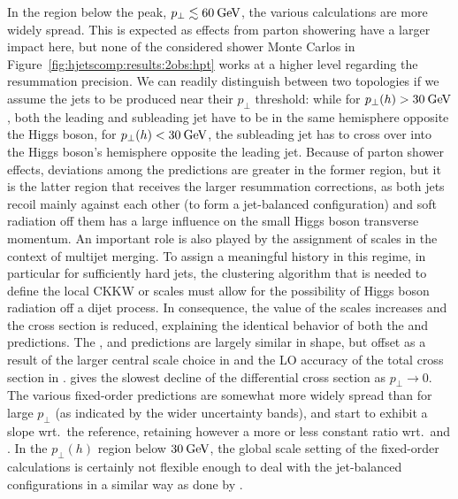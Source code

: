 In the region below the peak, $p_\perp\lesssim 60\text{\:GeV}$, the various
calculations are more widely spread. This is expected as effects from
parton showering have a larger impact here, but none of the considered
shower Monte Carlos in Figure~\ref{fig:hjetscomp:results:2obs:hpt}
works at a higher level regarding the resummation precision. We can
readily distinguish between two topologies if we assume the jets to be
produced near their $p_\perp$ threshold: while for
$p_\perp(h)>30\text{\:GeV}$, both the leading and subleading jet have to be in
the same hemisphere opposite the Higgs boson, for
$p_\perp(h)<30\text{\:GeV}$, the subleading jet has to cross over into the
Higgs boson's hemisphere opposite the leading jet.
Because of  parton shower effects, deviations among the predictions
are greater in the former region, but it is the latter region that
receives the larger resummation corrections, as both jets recoil mainly
against each other (to form a jet-balanced configuration) and soft
radiation off them has a large influence on the small Higgs boson
transverse momentum. An important role is also played by the
assignment of scales in the context of multijet merging.
To assign a meaningful history in this regime, in particular
for sufficiently hard jets, the clustering algorithm that is needed to
define the local CKKW or \Minlo scales must allow for the possibility
of Higgs boson radiation off a dijet process. In consequence, the value
of the scales increases and the cross section is reduced, explaining
the identical behavior of both the \Sherpa \MEPSatNLO and \Sherpa
\NNLOPS predictions.
The \Herwig, \MGaMC and \Hej predictions are largely similar in shape,
but offset as a result of the larger central scale choice in \MGaMC
and the LO accuracy of the total cross section in \Hej. \Powheg
\NNLOPS gives the slowest decline of the differential cross section as
$p_\perp\to0$.
The various fixed-order predictions are somewhat more widely spread than
for large $p_\perp$ (as indicated by the wider uncertainty bands), and
start to exhibit a slope wrt.~the \Powheg reference, retaining however
a more or less constant ratio wrt.~\Herwig and \MGaMC. In the
$p_\perp(h)$ region below $30\text{\:GeV}$, the global scale setting of the
fixed-order calculations is certainly not flexible enough to deal with
the jet-balanced configurations in a similar way as done by \Sherpa.


